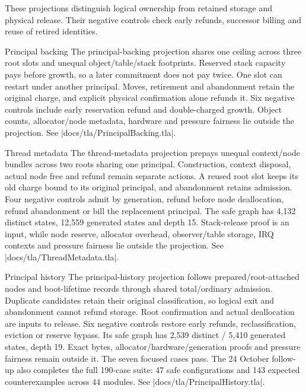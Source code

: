 These projections distinguish logical ownership from retained storage and
physical release. Their negative controls check early refunds, successor
billing and reuse of retired identities.

\begin{implementationdetail}{Principal backing}
The principal-backing projection shares one ceiling across three root slots and
unequal object/table/stack footprints. Reserved stack capacity pays before growth, so
a later commitment does not pay twice. One slot can restart under another
principal. Moves, retirement and abandonment retain the original charge, and explicit
physical confirmation alone refunds it. Six negative controls include early
reservation refund and double-charged growth. Object counts, allocator/node
metadata, hardware and pressure fairness lie outside the projection. See
\repofile|docs/tla/PrincipalBacking.tla|.
\end{implementationdetail}

\begin{implementationdetail}{Thread metadata}
The thread-metadata projection prepays unequal context/node bundles across two
roots sharing one principal. Construction, context disposal, actual node free
and refund remain separate actions. A reused root slot keeps its old charge
bound to its original principal, and abandonment retains admission. Four negative
controls admit by generation, refund before node deallocation, refund abandonment
or bill the replacement principal. The safe graph has 4,132 distinct states,
12,559 generated states and depth 15. Stack-release proof is an input, while node
reserve, allocator overhead, observer/table storage, IRQ contexts and pressure
fairness lie outside the projection. See
\repofile|docs/tla/ThreadMetadata.tla|.
\end{implementationdetail}

\begin{implementationdetail}{Principal history}
The principal-history projection follows prepared/root-attached nodes and
boot-lifetime records through shared total/ordinary admission. Duplicate
candidates retain their original classification, so logical exit and abandonment
cannot refund storage. Root confirmation and actual deallocation are inputs to
release. Six negative controls restore early refunds, reclassification, eviction
or reserve bypass. Its safe graph has 2,539 distinct / 5,410 generated states,
depth 19. Exact bytes, allocator/hardware/generation proofs and pressure fairness
remain outside it. The seven focused cases pass. The 24 October follow-up also completes the full
190-case suite: 47 safe configurations and 143 expected counterexamples across
44 modules. See
\repofile|docs/tla/PrincipalHistory.tla|.
\end{implementationdetail}

